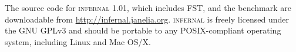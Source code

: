 The source code for \textsc{infernal} 1.01, which includes FST, and
the benchmark are downloadable from
\url{http://infernal.janelia.org}. \textsc{infernal} is freely
licensed under the GNU GPLv3 and should be portable to any
POSIX-compliant operating system, including Linux and Mac OS/X.


